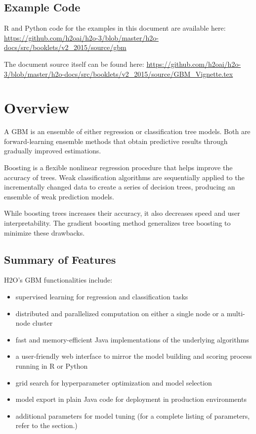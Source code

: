 

\subsection{Example Code}

R and Python code for the examples in this document are available here:
\url{https://github.com/h2oai/h2o-3/blob/master/h2o-docs/src/booklets/v2_2015/source/gbm}

The document source itself can be found here:
\url{https://github.com/h2oai/h2o-3/blob/master/h2o-docs/src/booklets/v2_2015/source/GBM_Vignette.tex}

\section{Overview}

A GBM is an ensemble of either regression or classification tree models.
Both are forward-learning ensemble methods that obtain predictive results through gradually improved estimations.

Boosting is a flexible nonlinear regression procedure that helps improve the accuracy of trees. Weak classification algorithms are sequentially applied to the incrementally changed data to create a series of decision trees, producing an ensemble of weak prediction models. 

While boosting trees increases their accuracy, it also decreases speed and user interpretability.
The gradient boosting method generalizes tree boosting to minimize these drawbacks.

\subsection{Summary of Features}
H2O's GBM functionalities include:

\begin{itemize}
\item supervised learning for regression and classification tasks
\item distributed and parallelized computation on either a single node or a multi-node cluster
\item fast and memory-efficient Java implementations of the underlying algorithms
\item a user-friendly web interface to mirror the model building and scoring process running in R or Python
\item grid search for hyperparameter optimization and model selection
\item model export in plain Java code for deployment in production environments
\item additional parameters for model tuning (for a complete listing of parameters, refer to the section.)
\end{itemize}


